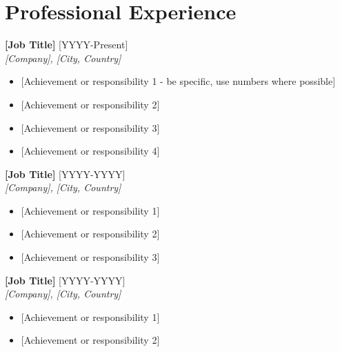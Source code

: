 \documentclass[11pt,a4paper,sans]{moderncv}
\begin{document}

\section{Professional Experience}
\vspace{3pt}

\noindent\textbf{[Job Title]} \hfill \textcolor{color1}{[YYYY-Present]}\\
\textit{[Company], [City, Country]}
\begin{itemize}
    \item{} [Achievement or responsibility 1 - be specific, use numbers where possible]
    \item{} [Achievement or responsibility 2]
    \item{} [Achievement or responsibility 3]
    \item{} [Achievement or responsibility 4]
\end{itemize}

\vspace{3pt}

\noindent\textbf{[Job Title]} \hfill \textcolor{color1}{[YYYY-YYYY]}\\
\textit{[Company], [City, Country]}
\begin{itemize}
    \item{} [Achievement or responsibility 1]
    \item{} [Achievement or responsibility 2]
    \item{} [Achievement or responsibility 3]
\end{itemize}

\vspace{3pt}

\noindent\textbf{[Job Title]} \hfill \textcolor{color1}{[YYYY-YYYY]}\\
\textit{[Company], [City, Country]}
\begin{itemize}
    \item{} [Achievement or responsibility 1]
    \item{} [Achievement or responsibility 2]
\end{itemize}

\end{document}
